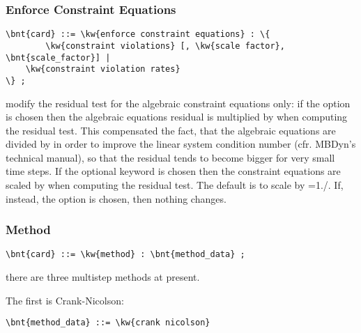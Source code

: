 \subsubsection{Enforce Constraint Equations}
\begin{Verbatim}[commandchars=\\\{\}]
    \bnt{card} ::= \kw{enforce constraint equations} : \{
    	\kw{constraint violations} [, \kw{scale factor}, \bnt{scale_factor}] | 
	\kw{constraint violation rates} 
\} ;
\end{Verbatim}
modify the residual test for the algebraic constraint equations only:
if the option  is chosen then the algebraic equations
residual is multiplied by  when computing the residual test.
This compensated the fact, that the algebraic equations are divided by 
 in order to improve the linear system condition number (cfr. MBDyn's
technical manual), so that the residual tends to become bigger for very small time steps.
If the optional keyword  is chosen then 
the constraint equations are scaled by  when computing the residual test.
The default is to scale by =1./.
If, instead, the option  is chosen, then nothing changes.

\subsubsection{Method}
\begin{Verbatim}[commandchars=\\\{\}]
    \bnt{card} ::= \kw{method} : \bnt{method_data} ;
\end{Verbatim}
there are three multistep methods at present. 

The first is Crank-Nicolson:
\begin{Verbatim}[commandchars=\\\{\}]
    \bnt{method_data} ::= \kw{crank nicolson}
\end{Verbatim}

